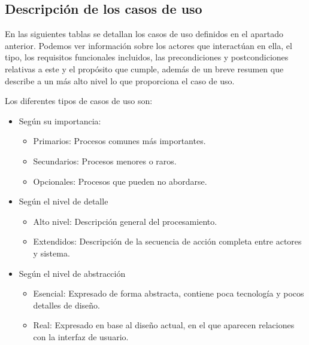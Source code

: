 \subsection{Descripción de los casos de uso}

En las siguientes tablas se detallan los casos de uso definidos en el apartado anterior. Podemos ver información sobre
los actores que interactúan en ella, el tipo, los requisitos funcionales incluidos, las precondiciones y
postcondiciones relativas a este y el propósito que cumple, además de un breve resumen que describe a un más alto
nivel lo que proporciona el caso de uso.

Los diferentes tipos de casos de uso son:

\begin{itemize}
    \item Según su importancia:
    \begin{itemize}
        \item Primarios: Procesos comunes más importantes.
        \item Secundarios: Procesos menores o raros.
        \item Opcionales: Procesos que pueden no abordarse.
    \end{itemize}

    \item Según el nivel de detalle
    \begin{itemize}
        \item Alto nivel: Descripción general del procesamiento.
        \item Extendidos: Descripción de la secuencia de acción completa entre actores y sistema.
    \end{itemize}

    \item Según el nivel de abstracción
    \begin{itemize}
        \item Esencial: Expresado de forma abstracta, contiene poca tecnología y pocos detalles de diseño.
        \item Real: Expresado en base al diseño actual, en el que aparecen relaciones con la interfaz de usuario.
    \end{itemize}
\end{itemize}


